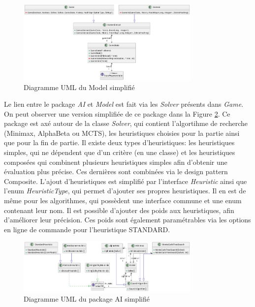 \documentclass{article}
\begin{document}
\begin{figure}[h]
    \centering
    \includegraphics[width=0.8\textwidth]{uml_model}
    \caption{Diagramme UML du Model simplifié}
    \label{umlModel}
\end{figure}
\FloatBarrier

Le lien entre le package \textit{AI} et \textit{Model} est fait via les \textit{Solver} présents dans \textit{Game}.
On peut observer une version simplifiée de ce package dans la Figure \ref{umlAi}. Ce package est axé autour de la classe
\textit{Solver}, qui contient l'algortihme de recherche (Minimax, AlphaBeta ou MCTS), les heuristiques choisies pour la partie ainsi que pour la fin de partie.
Il existe deux types d'heuristiques: les heuristiques simples, qui ne dépendent que d'un critère (en une classe) et les heuristiques composées qui combinent 
plusieurs heuristiques simples afin d'obtenir une évaluation plus précise. Ces dernières sont combinées via le design pattern Composite.
L'ajout d'heuristiques est simplifié par l'interface \textit{Heuristic} ainsi que l'enum \textit{HeuristicType}, qui permet d'ajouter ses propres heuristiques.
Il en est de même pour les algorithmes, qui possèdent une interface commune et une enum contenant leur nom.
Il est possible d'ajouter des poids aux heuristiques, afin d'améliorer leur précision. Ces poids sont également paramétrables via les
options en ligne de commande pour l'heuristique STANDARD.
\begin{figure}[h]
    \centering
    \includegraphics[width=0.8\textwidth]{uml_ai}
    \caption{Diagramme UML du package AI simplifié}
    \label{umlAi}
\end{figure}
\FloatBarrier
\end{document}
